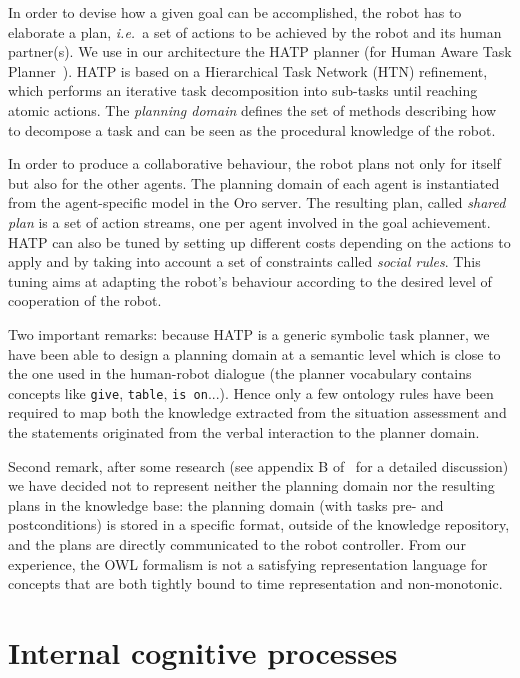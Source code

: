 \documentclass[letterpaper, 10 pt, conference]{ieeeconf}  %
\newcommand{\ie}{{\textit{i.e.\ }}}
\begin{document}
In order to devise how a given goal can be accomplished, the robot has to
elaborate a plan, \ie a set of actions to be achieved by the robot and its
human partner(s).  We use in our architecture the HATP planner (for Human Aware
Task Planner~\cite{Alili2009}).  HATP is based on a Hierarchical Task Network
(HTN) refinement, which performs an iterative task decomposition into sub-tasks
until reaching atomic actions.  The \emph{planning domain} defines the set of
methods describing how to decompose a task and can be seen as the procedural
knowledge of the robot.

In order to produce a collaborative behaviour, the robot plans not only for
itself but also for the other agents. The planning domain of each agent is
instantiated from the agent-specific model in the {\sc Oro} server. The resulting
plan, called \emph{shared plan} is a set of action streams, one per
agent involved in the goal achievement. HATP can also be tuned by setting up
different costs depending on the actions to apply and by taking into account a
set of constraints called \emph{social rules}. This tuning aims at adapting the
robot's behaviour according to the desired level of cooperation of the robot.


Two important remarks: because HATP is a generic symbolic task planner, we have
been able to design a planning domain at a semantic level which is close to the
one used in the human-robot dialogue (the planner vocabulary contains concepts
like \texttt{give}, \texttt{table}, \texttt{is on}...). Hence only a few
ontology rules have been required to map both the knowledge extracted from the
situation assessment and the statements originated from the verbal interaction
to the planner domain.

Second remark, after some research (see appendix B of~\cite{Lemaignan2012a} for
a detailed discussion)  we have decided not to represent neither the planning
domain nor the resulting plans in the knowledge base: the planning domain (with
tasks pre- and postconditions) is stored in a specific format, outside of the
knowledge repository, and the plans are directly communicated to the robot
controller. From our experience, the OWL formalism is not a satisfying
representation language for concepts that are both tightly bound to time
representation and non-monotonic.


\section{Internal cognitive processes}
\label{sect|intern}
\end{document}

